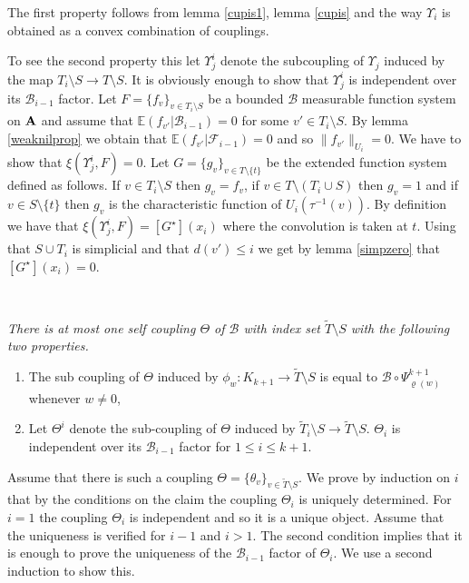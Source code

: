 \documentclass [11pt] {article}
\def\con{\star}
\def\bA{{\bf A}}
\begin{document}
\medskip

The first property follows from lemma \ref{cupis1}, lemma \ref{cupis} and the way $\Upsilon_i$ is obtained as a convex combination of couplings. 

To see the second property this let $\Upsilon^i_j$ denote the subcoupling of $\Upsilon_j$ induced by the map $T_i\setminus S\rightarrow T\setminus S$. It is obviously enough to show that $\Upsilon^i_j$ is independent over its $\mathcal{B}_{i-1}$ factor.
Let $F=\{f_v\}_{v\in T_i\setminus S}$ be a bounded $\mathcal{B}$ measurable function system on $\bA$ and assume that 
$\mathbb{E}(f_{v'}|\mathcal{B}_{i-1})=0$ for some $v'\in T_i\setminus S$. By lemma \ref{weaknilprop} we obtain that $\mathbb{E}(f_{v'}|\mathcal{F}_{i-1})=0$ and so $\|f_{v'}\|_{U_i}=0$. We have to show that $\xi(\Upsilon^i_j,F)=0$.
Let $G=\{g_v\}_{v\in T\setminus\{t\}}$ be the extended function system defined as follows. If $v\in T_i\setminus S$ then $g_v=f_v$, if $v\in T\setminus (T_i\cup S)$ then $g_v=1$ and if $v\in {S\setminus\{t\}}$ then $g_v$ is the characteristic function of $U_i(\tau^{-1}(v))$. By definition we have that $\xi(\Upsilon^i_j,F)=[G^\con](x_i)$ where the convolution is taken at $t$. Using that $S\cup T_i$ is simplicial and that $d(v')\leq i$ we get by lemma \ref{simpzero} that $[G^\con](x_i)=0$.

\medskip

~~{\it There is at most one self coupling $\Theta$ of $\mathcal{B}$ with index set $\tilde{T}\setminus S$ with the following two properties.
\begin{enumerate}
\item The sub coupling of $\Theta$ induced by  $\phi_w:K_{k+1}\rightarrow \tilde{T}\setminus S$ is equal to $\mathcal{B}\circ\Psi_{\varrho(w)}^{k+1}$ whenever $w\neq 0$,
\item Let $\Theta^i$ denote the sub-coupling of $\Theta$ induced by $\tilde{T}_i\setminus S\rightarrow \tilde{T}\setminus S$. $\Theta_i$ is independent over its $\mathcal{B}_{i-1}$ factor for $1\leq i\leq k+1$.
\end{enumerate}
}

Assume that there is such a coupling $\Theta=\{\theta_v\}_{v\in\tilde{T}\setminus S}$. We prove by induction on $i$ that by the conditions on the claim the coupling $\Theta_i$ is uniquely determined. For $i=1$ the coupling $\Theta_i$ is independent and so it is a unique object. Assume that the uniqueness is verified for $i-1$ and $i>1$. The second condition implies that it is enough to prove the uniqueness of the $\mathcal{B}_{i-1}$ factor of $\Theta_i$. We use a second induction to show this.
\end{document}
